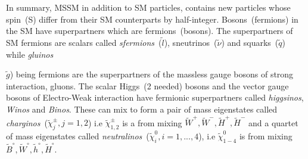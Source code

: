 In summary, MSSM in addition to SM particles, contains new particles whose spin~(S) differ from their SM counterparts by half-integer. Bosons~(fermions) in the SM have superpartners which are fermions~(bosons).
The superpartners of SM fermions are scalars called \textit{sfermions}~($\tilde{l}$), sneutrinos~($\tilde{\nu}$) and squarks~($\tilde{q}$) while \textit{gluinos}~{$\tilde{g}$) being fermions are the superpartners of the massless gauge bosons of strong interaction, gluons. The scalar Higgs~(2 needed) bosons and the vector gauge bosons of Electro-Weak interaction have fermionic superpartners called \textit{higgsinos}, \textit{Winos} and \textit{Binos}. These can mix to form a pair of mass eigenstates called \textit{charginos}~($\tilde{\chi}^{\pm}_{j}, j=1,2$) i.e 
$\tilde{\chi}^{\pm}_{1,2}$ is a from mixing $\tilde{W}^{+}, \tilde{W}^{-}, \tilde{H}^{+}, \tilde{H}^{-} $ and a quartet of mass  eigenstates called \textit{neutralinos}~($\tilde{\chi}^{0}_{i}, i=1,...,4$), i.e $\tilde{\chi}^{0}_{1-4}$ is from mixing $\tilde{B}^{\circ}, \tilde{W}^{\circ}, \tilde{h}^{\circ}, \tilde{H}^{\circ} $.

}
